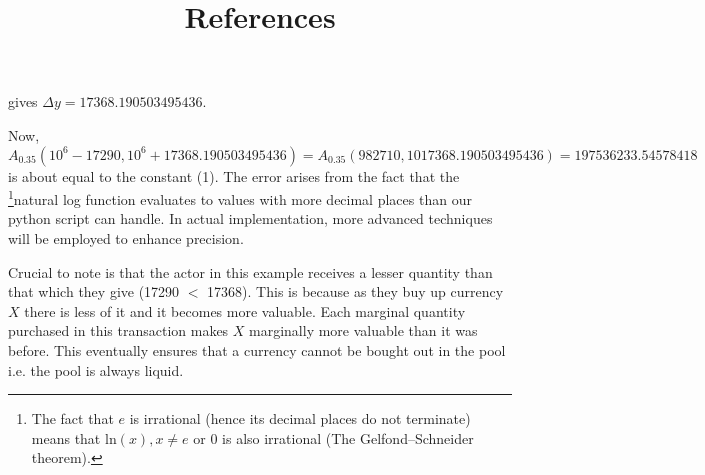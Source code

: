 \documentclass{article}
\begin{document}
\noindent gives $\Delta y = 17368.190503495436$.

\vspace{0,3cm}
\noindent Now, $$A_{0.35}(10^6-17290,10^6+17368.190503495436) = A_{0.35}(982710,1017368.190503495436) = 197536233.54578418$$ is about equal to the constant (1). The error arises from the fact that the \footnote{The fact that $e$ is irrational (hence its decimal places do not terminate) means that $\text{ln}(x), x \ne e \text{ or } 0$ is also irrational (The Gelfond–Schneider theorem).}natural log function evaluates to values with more decimal places than our python script can handle. In actual implementation, more advanced techniques will be employed to enhance precision.

\vspace{0.3cm}
\noindent Crucial to note is that the actor in this example receives a lesser quantity than that which they give (17290 
$<$ 17368). This is because as they buy up currency $X$ there is less of it and it becomes more valuable. Each marginal quantity purchased in this transaction makes $X$ marginally more valuable than it was before. This eventually ensures that a currency cannot be bought out in the pool i.e. the pool is always liquid.

\pagebreak

\title{References}



 
\end{document}
